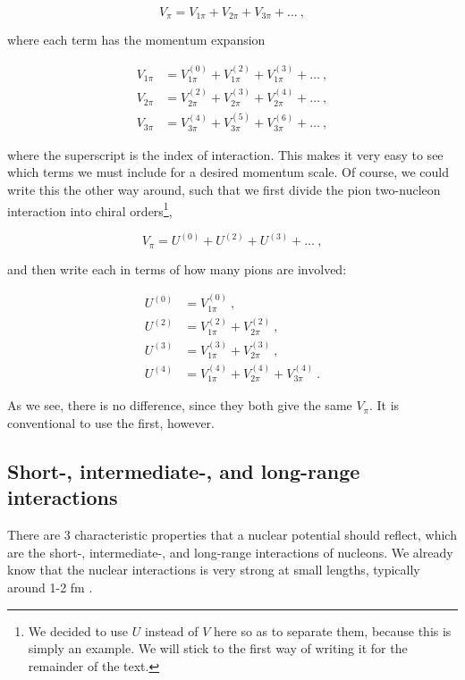\documentclass[10pt,twoside]{report}
\begin{document}
	\begin{equation}
		V_{\pi} = V_{1\pi}+V_{2\pi}+V_{3\pi}+\ldots \:,
	\end{equation}
	
	\noindent where each term has the momentum expansion
	
	\begin{align}
		V_{1\pi} &= V_{1\pi}^{(0)} + V_{1\pi}^{(2)} + V_{1\pi}^{(3)} +\ldots \:,\\
		V_{2\pi} &= V_{2\pi}^{(2)} + V_{2\pi}^{(3)} + V_{2\pi}^{(4)} +\ldots \:,\\
		V_{3\pi} &= V_{3\pi}^{(4)} + V_{3\pi}^{(5)} + V_{3\pi}^{(6)} +\ldots \:,
	\end{align}
	
	\noindent where the superscript is the index of interaction. This makes it very easy to see which terms we must include for a desired momentum scale. Of course, we could write this the other way around, such that we first divide the pion two-nucleon interaction into chiral orders\footnote{We decided to use $U$ instead of $V$ here so as to separate them, because this is simply an example. We will stick to the first way of writing it for the remainder of the text.},
	
	\begin{equation}
	V_{\pi} = U^{(0)}+U^{(2)}+U^{(3)}+\ldots \:,
	\end{equation}
	
	\noindent and then write each in terms of how many pions are involved:
	
	\begin{align}
	U^{(0)} &= V_{1\pi}^{(0)} \:,\\
	U^{(2)} &= V_{1\pi}^{(2)} + V_{2\pi}^{(2)} \:,\\
	U^{(3)} &= V_{1\pi}^{(3)} + V_{2\pi}^{(3)} \:,\\
	U^{(4)} &= V_{1\pi}^{(4)} + V_{2\pi}^{(4)} + V_{3\pi}^{(4)} \:.
	\end{align}
	
	As we see, there is no difference, since they both give the same $V_\pi$. It is conventional to use the first, however.
	
	\subsection{Short-, intermediate-, and long-range interactions}
	There are 3 characteristic properties that a nuclear potential should reflect, which are the short-, intermediate-, and long-range interactions of nucleons. We already know that the nuclear interactions is very strong at small lengths, typically around 1-2 fm \cite{phy981}.
	
\end{document}
